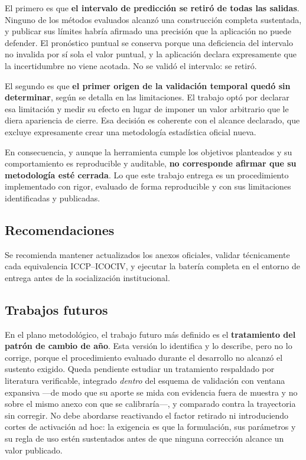 \documentclass[12pt,letterpaper]{article}
\newcommand{\ICOCIV}{ICOCIV}
\newcommand{\ICCP}{ICCP}
\begin{document}
El primero es que \textbf{el intervalo de predicción se retiró de todas las
salidas}. Ninguno de los métodos evaluados alcanzó una construcción completa
sustentada, y publicar sus límites habría afirmado una precisión que la
aplicación no puede defender. El pronóstico puntual se conserva porque una
deficiencia del intervalo no invalida por sí sola el valor puntual, y la
aplicación declara expresamente que la incertidumbre no viene acotada. No se
validó el intervalo: se retiró.

El segundo es que \textbf{el primer origen de la validación temporal quedó sin
determinar}, según se detalla en las limitaciones. El trabajo optó por declarar
esa limitación y medir su efecto en lugar de imponer un valor arbitrario que le
diera apariencia de cierre. Esa decisión es coherente con el alcance declarado,
que excluye expresamente crear una metodología estadística oficial nueva.

En consecuencia, y aunque la herramienta cumple los objetivos planteados y su
comportamiento es reproducible y auditable, \textbf{no corresponde afirmar que su
metodología esté cerrada}. Lo que este trabajo entrega es un procedimiento
implementado con rigor, evaluado de forma reproducible y con sus limitaciones
identificadas y publicadas.

\subsection{Recomendaciones}

Se recomienda mantener actualizados los anexos oficiales, validar técnicamente cada equivalencia \ICCP--\ICOCIV{}, y ejecutar la batería completa en el entorno de entrega antes de la socialización institucional.

\subsection{Trabajos futuros}

En el plano metodológico, el trabajo futuro más definido es el \textbf{tratamiento del patrón de cambio de año}. Esta versión lo identifica y lo describe, pero no lo corrige, porque el procedimiento evaluado durante el desarrollo no alcanzó el sustento exigido. Queda pendiente estudiar un tratamiento respaldado por literatura verificable, integrado \emph{dentro} del esquema de validación con ventana expansiva ---de modo que su aporte se mida con evidencia fuera de muestra y no sobre el mismo anexo con que se calibraría---, y comparado contra la trayectoria sin corregir. No debe abordarse reactivando el factor retirado ni introduciendo cortes de activación ad hoc: la exigencia es que la formulación, sus parámetros y su regla de uso estén sustentados antes de que ninguna corrección alcance un valor publicado.
\end{document}

